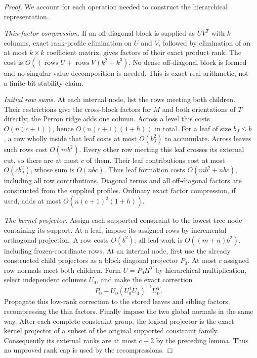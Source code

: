 \documentclass[11pt]{amsart}
\theoremstyle{definition}\newtheorem{definition}[theorem]{Definition}
\theoremstyle{remark}\newtheorem{remark}[theorem]{Remark}
\numberwithin{equation}{section}
\begin{document}
\begin{proof}
We account for each operation needed to construct the hierarchical
representation.

\emph{Thin-factor compression.}
If an off-diagonal block is supplied as $UV^T$ with $k$ columns, exact
rank-profile elimination on $U$ and $V$, followed by elimination of an
at most $k\times k$ coefficient matrix, gives factors of their exact
product rank. The cost is
$O((\operatorname{rows}U+\operatorname{rows}V)k^2+k^3)$.
No dense off-diagonal block is formed and no singular-value decomposition
is needed. This is exact real arithmetic, not a finite-bit stability claim.

\emph{Initial row sums.}
At each internal node, list the rows meeting both children. Their
restrictions give the cross-block factors for $M$ and both orientations
of $T$ directly; the Perron ridge adds one column. Across a level this
costs $O(n(c+1))$, hence $O(n(c+1)(1+h))$ in total.
For a leaf of size $b_J\le b$, a row wholly inside that leaf costs at most
$O(b_J^2)$ to accumulate. Across leaves such rows cost $O(mb^2)$.
Every other row meeting this leaf crosses its external cut, so there are
at most $c$ of them. Their leaf contributions cost at most
$O(cb_J^2)$, whose sum is $O(nbc)$. Thus leaf formation costs $O(mb^2+nbc)$, including all row contributions. Diagonal terms and all off-diagonal factors are constructed
from the supplied profiles. Ordinary exact factor compression, if used,
adds at most $O(n(c+1)^2(1+h))$.

\emph{The kernel projector.}
Assign each supported constraint to the lowest tree node containing its
support. At a leaf, impose its assigned rows by incremental orthogonal
projection. A row costs $O(b^2)$; all leaf work is
$O((m+n)b^2)$, including frozen-coordinate rows. At an internal node,
first use the already constructed child projectors as a block diagonal
projector $P_0$. At most $c$ assigned row normals meet both children.
Form $U=P_0H^T$ by hierarchical multiplication, select independent columns
$U_0$, and make the exact correction
\[
 P_0-U_0(U_0^TU_0)^{-1}U_0^T.
\]
Propagate this low-rank correction to the stored leaves and sibling factors,
recompressing the thin factors. Finally impose the two global normals in
the same way. After each complete constraint group, the logical projector is the exact kernel projector
of a subset of the original supported constraint family. Consequently its
external ranks are at most $c+2$ by the preceding lemma. Thus no unproved
rank cap is used by the recompressions.


\end{proof}
\end{document}
